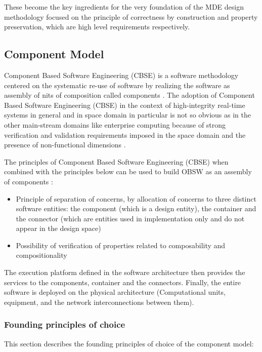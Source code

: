 These become the key ingredients for the very foundation of the MDE design methodology focused on the principle of correctness by construction and property preservation, which are high level requirements respectively.

\subsection{Component Model}
Component Based Software Engineering (CBSE) is a software methodology centered on the systematic re-use of software by realizing the software as assembly of nits of composition called components \cite{CBSE}.
The adoption of Component Based Software Engineering (CBSE) in the context of high-integrity real-time systems in general and in space domain in particular is not so obvious as in the other main-stream domains like enterprise computing \cite{SAVOIR} because of strong verification and validation requirements imposed in the space domain and the presence of non-functional dimensions \cite{SAVOIR}.

The principles of Component Based Software Engineering (CBSE) when combined with the principles below can be used to build OBSW as an assembly of components \cite{SAVOIR}: 
\begin{itemize}
\item Principle of separation of concerns, by allocation of concerns to three distinct software entities: the component (which is a design entity), the container and the connector (which are entities used in implementation only and do not appear in the design space)
\item Possibility of verification of properties related to composability and compositionality \cite{CompBasedDev} 
\end{itemize}

The execution platform defined in the software architecture then provides the services to the components, container and the connectors. Finally, the entire software is deployed on the physical architecture (Computational units, equipment, and the network interconnections between them).

\subsubsection{Founding principles of choice}
This section describes the founding principles of choice of the component model:

